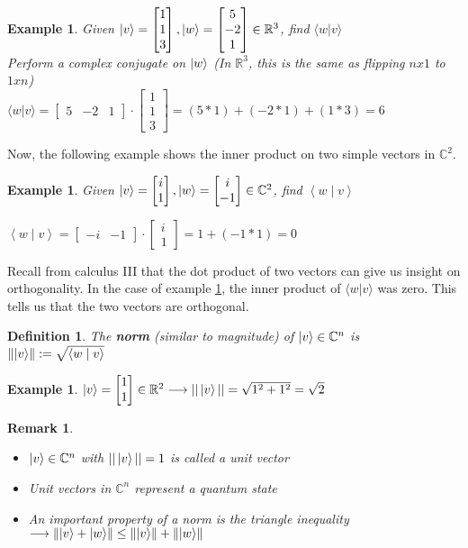 \documentclass[12pt]{article}
\theoremstyle{plain}
\theoremstyle{nonumberplain}
\theoremstyle{plain}
\newtheorem{definition}[lemma]{Definition}
\newtheorem{example}[lemma]{Example}
\newtheorem{remark}[lemma]{Remark}
\theoremstyle{nonumberplain}
\newcommand\1{{\bf 1}}
\newcommand{\bmat}[1]{\begin{bmatrix*} #1 \end{bmatrix*}} %
\newcommand{\R}{\mathbb{R}} %
\newcommand{\C}{\mathbb{C}} %
\newcommand{\<}{\left\langle}
\renewcommand{\>}{\right\rangle}
\newcommand{\norm}[1]{\left\lVert#1\right\rVert} %
\newcommand{\inp}[2]{\left\langle#1\mid #2\right\rangle} %
\begin{document}
\begin{example}
Given $\ket{v}=\bmat{1 \\ 1\\ 3}, \ket{w}=\bmat{5 \\ -2 \\ 1}\in\R^3$, find $\langle w|v \rangle$ \\
\indent Perform a complex conjugate on $\ket{w}$ (In $\R^3$, this is the same as flipping $nx1$ to $1xn$) \\
\indent $\langle w|v \rangle=\bmat{5 & -2 & 1}\cdot\bmat{1 \\ 1 \\ 3}=(5*1)+(-2*1)+(1*3)=6$
\end{example}
Now, the following example shows the inner product on two simple vectors in $\C^2$.
\begin{example}\label{ex:cpcmp}
Given $\ket{v}=\bmat{i \\ 1}, \ket{w}=\bmat{i \\ -1}\in\C^2$, find $\inp{w}{v}$
\begin{center}
$\inp{w}{v}=\bmat{-i & -1}\cdot\bmat{i \\ 1}=1+(-1*1)=0$
\end{center}
\end{example}
Recall from calculus III that the dot product of two vectors can give us insight on orthogonality. In the case of example \ref{ex:cpcmp}, the inner product of $\langle w|v \rangle$ was zero. This tells us that the two vectors are orthogonal.
\begin{definition}
The \textbf{norm} (similar to magnitude) of $\ket{v}\in\C^n$ is $\norm{\ket{v}}:=\sqrt{\inp{w}{v}}$ 
\end{definition}
\begin{example}
$\ket{v}=\bmat{1 \\ 1}\in\R^2\longrightarrow||\ket{v}||=\sqrt{1^2+1^2}=\sqrt{2}$
\end{example}
\begin{remark}
\begin{itemize}
	\item $\ket{v}\in\C^n$ with $||\ket{v}||=1$ is called a unit vector
	\item Unit vectors in $\C^n$ represent a \textit{quantum state}
	\item An important property of a norm is the \textit{triangle inequality} $\longrightarrow\norm{\ket{v}+\ket{w}}\leq\norm{\ket{v}}+\norm{\ket{w}}$
\end{itemize}
\end{remark}
\end{document}

